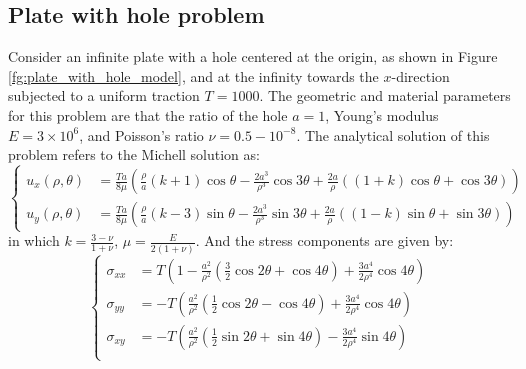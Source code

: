 

\subsection{Plate with hole problem}
Consider an infinite plate with a hole centered at the origin, as shown in Figure \ref{fg:plate_with_hole_model}, and at the infinity towards the $x$-direction subjected to a uniform traction $T=1000$. The geometric and material parameters for this problem are that the ratio of the hole $a=1$, Young's modulus $E=3\times 10^6$, and Poisson's ratio $\nu = 0.5-10^{-8}$. The analytical solution of this problem refers to the Michell solution \cite{timoshenko1969theory} as:
\begin{equation}\label{plate_with_hole_exact}
\left\{
\begin{aligned}
u_x(\rho,\theta)&=\frac{Ta}{8\mu}\left( \frac{\rho}{a}(k+1)\cos\theta - \frac{2a^3}{\rho^3}\cos3\theta + \frac{2a}{\rho}((1+k)\cos\theta + \cos3\theta) \right) \\
u_y(\rho,\theta)&=\frac{Ta}{8\mu}\left( \frac{\rho}{a}(k-3)\sin\theta - \frac{2a^3}{\rho^3}\sin3\theta + \frac{2a}{\rho}((1-k)\sin\theta + \sin3\theta) \right)
\end{aligned}
\right.
\end{equation}
in which $k = \frac{3-\nu}{1+\nu}$, $\mu = \frac{E}{2(1+\nu)}$. And the stress components are given by:
\begin{equation}
\left\{
\begin{aligned}
\sigma_{xx}&=T\left( 1 - \frac{a^2}{\rho^2}\left( \frac{3}{2}\cos2\theta + \cos4\theta \right) + \frac{3a^4}{2\rho^4}\cos4\theta \right) \\
\sigma_{yy}&=-T\left( \frac{a^2}{\rho^2}\left( \frac{1}{2}\cos2\theta - \cos4\theta \right) + \frac{3a^4}{2\rho^4}\cos4\theta \right) \\
\sigma_{xy}&=-T\left( \frac{a^2}{\rho^2}\left( \frac{1}{2}\sin2\theta + \sin4\theta \right) - \frac{3a^4}{2\rho^4}\sin4\theta \right) \\
\end{aligned}
\right.
\end{equation}

